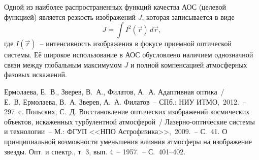 \documentclass[pscyr,titlepage]{hedreport}
\begin{document}
Одной из наиболее распространенных функций качества АОС (целевой функцией)
является резкость изображений \( J \), которая записывается в виде
\begin{equation}
  J = \int I^2(\vec{r})\,d\vec{r},
  \label{eq11}
\end{equation}
где \( I(\vec{r}) \)~-- интенсивность изображения в фокусе приемной оптической
системы. Её широкое использование в АОС обусловлено наличием однозначной связи
между глобальным максимумом \( J \) и полной компенсацией атмосферных фазовых
искажений.

\pagebreak %
\renewcommand{\bibname}{Список литературы}

\begin{thebibliography}{9}
   Ермолаева, Е.~В., Зверев, В.~А., Филатов, А.~А. Адаптивная
    оптика~/\\ Е.~В. Ермолаева, В.~А. Зверев, А.~А. Филатов~-- СПб.: НИУ
    ИТМО,~2012.~-- 297~с.
   Польских, С.~Д. Восстановление оптических изображений космических
    объектов, искаженных турбулентной атмосферой~/ Лазерно-оптические системы и
    технологии~-- М.: ФГУП <<НПО Астрофизика>>,~2009.~-- С.~41.
   О принципиальной возможности уменьшения влияния атмосферы на
    изображение звезды. Опт. и спектр., т. 3, вып. 4~-- 1957.~-- С.~401--402.
\end{thebibliography}
\end{document}
